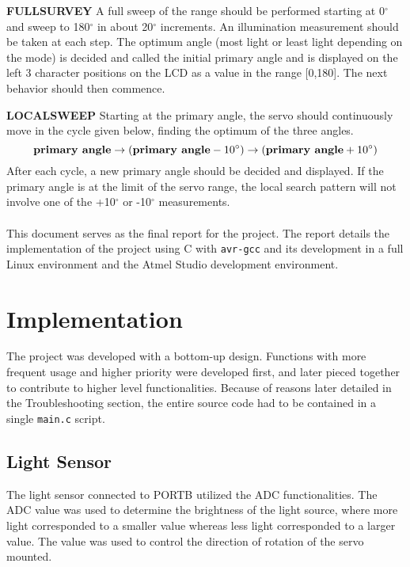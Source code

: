 \documentclass[usletter, 12pt]{article}
\begin{document}
    \noindent \textbf{FULLSURVEY} A full sweep of the range should be performed
    starting at 0$^{\circ}$ and sweep to 180$^{\circ}$ in about 20$^{\circ}$
    increments. An illumination measurement should be taken at each step. The
    optimum angle (most light or least light depending on the mode) is decided
    and called the initial primary angle and is displayed on the left 3
    character positions on the LCD as a value in the range [0,180]. The next
    behavior should then commence.

    \noindent \textbf{LOCALSWEEP} Starting at the primary angle, the servo should continuously move in the cycle given below, finding
    the optimum of the three angles.
        \[ \text{\textbf{primary angle}} \rightarrow (\text{\textbf{primary
        angle}} - 10^\circ) \rightarrow (\text{\textbf{primary angle}} +
        10^\circ) \]
    \noindent After each cycle, a new primary angle should be decided and
    displayed. If the primary angle is at the limit of the servo range, the
    local search pattern will not involve one of the +10$^{\circ}$ or
    -10$^{\circ}$ measurements. \\~\\
    \noindent This document serves as the final report for the project. The
    report details the implementation of the project using C with \texttt{avr-gcc} and its development in a full Linux environment and the Atmel
    Studio development environment.

    \section{Implementation} The project was developed with a bottom-up
    design. Functions with more frequent usage and higher priority were
    developed first, and later pieced together to contribute to higher level
    functionalities. Because of reasons later detailed in the Troubleshooting
    section, the entire source code had to be contained in a single
    \texttt{main.c} script.

    \subsection{Light Sensor} The light sensor connected to PORTB utilized the
    ADC functionalities. The ADC value was used to determine the brightness of
    the light source, where more light corresponded to a smaller value whereas
    less light corresponded to a larger value. The value was used to control
    the direction of rotation of the servo mounted. \\~\\
\end{document}
